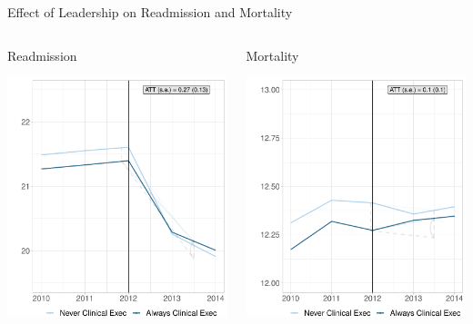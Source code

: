\documentclass[notes,11pt, aspectratio=169]{beamer}
\begin{document}
\begin{frame}{Effect of Leadership on Readmission and Mortality}
\begin{columns}
    \begin{column}{0.5\textwidth}
        \centering
        Readmission

        \vspace{1mm}
        \includegraphics[width=.8\textwidth]{Objects/read_md_nomd_synth_graph.pdf}
    \end{column}
        \begin{column}{0.5\textwidth}
        \centering
        Mortality
        
        \vspace{1mm}
        \includegraphics[width=.8\textwidth]{Objects/mort_md_nomd_synth_graph.pdf}
    \end{column}
\end{columns}
\end{frame}
\end{document}
